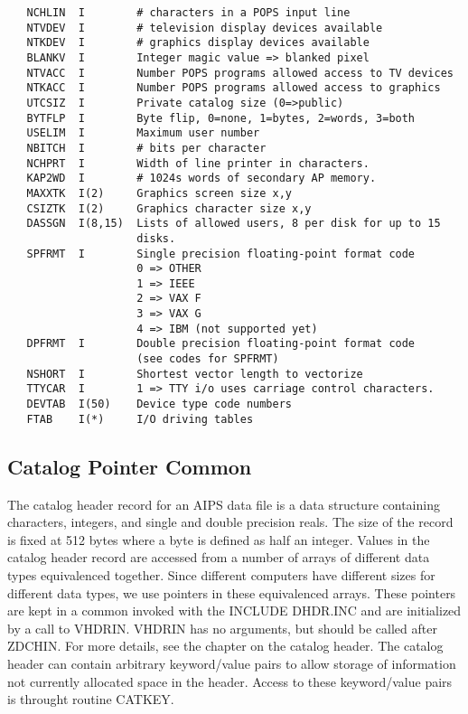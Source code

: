 \begin{verbatim}
   NCHLIN  I        # characters in a POPS input line
   NTVDEV  I        # television display devices available
   NTKDEV  I        # graphics display devices available
   BLANKV  I        Integer magic value => blanked pixel
   NTVACC  I        Number POPS programs allowed access to TV devices
   NTKACC  I        Number POPS programs allowed access to graphics
   UTCSIZ  I        Private catalog size (0=>public)
   BYTFLP  I        Byte flip, 0=none, 1=bytes, 2=words, 3=both
   USELIM  I        Maximum user number
   NBITCH  I        # bits per character
   NCHPRT  I        Width of line printer in characters.
   KAP2WD  I        # 1024s words of secondary AP memory.
   MAXXTK  I(2)     Graphics screen size x,y
   CSIZTK  I(2)     Graphics character size x,y
   DASSGN  I(8,15)  Lists of allowed users, 8 per disk for up to 15
                    disks.
   SPFRMT  I        Single precision floating-point format code
                    0 => OTHER
                    1 => IEEE
                    2 => VAX F
                    3 => VAX G
                    4 => IBM (not supported yet)
   DPFRMT  I        Double precision floating-point format code
                    (see codes for SPFRMT)
   NSHORT  I        Shortest vector length to vectorize
   TTYCAR  I        1 => TTY i/o uses carriage control characters.
   DEVTAB  I(50)    Device type code numbers
   FTAB    I(*)     I/O driving tables

\end{verbatim}


\subsection{Catalog Pointer Common}

 The catalog header record for an AIPS data file is a data structure
containing characters, integers, and single and double precision
reals.  The size of the record is fixed at 512 bytes where a byte is
defined as half an integer.  Values in the catalog header record are
accessed from a number of arrays of different data types equivalenced
together.  Since different computers have different sizes for
different data types, we use pointers in these equivalenced arrays.
These pointers are kept in a common invoked with the INCLUDE DHDR.INC
and are initialized by a call to VHDRIN.  VHDRIN has no arguments, but
should be called after ZDCHIN.  For more details, see the chapter on
the catalog header.  The catalog header can contain arbitrary
keyword/value pairs to allow storage of information not currently
allocated space in the header.  Access to these keyword/value pairs is
throught routine CATKEY.

